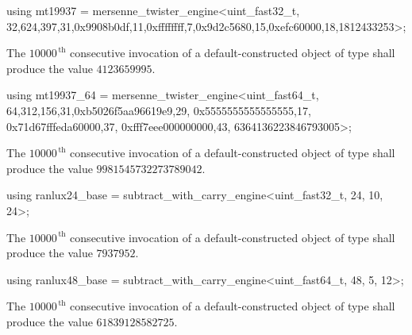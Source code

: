 %
%
\begin{itemdecl}
using mt19937 =
      mersenne_twister_engine<uint_fast32_t,
       32,624,397,31,0x9908b0df,11,0xffffffff,7,0x9d2c5680,15,0xefc60000,18,1812433253>;
\end{itemdecl}

\begin{itemdescr}
\pnum\required
 The $10000^{\,\mathrm{th}}$ consecutive invocation
 of a default-constructed object
 of type 
 shall produce the value $4123659995$.
\end{itemdescr}

%
%
\begin{itemdecl}
using mt19937_64 =
      mersenne_twister_engine<uint_fast64_t,
       64,312,156,31,0xb5026f5aa96619e9,29,
       0x5555555555555555,17,
       0x71d67fffeda60000,37,
       0xfff7eee000000000,43,
       6364136223846793005>;
\end{itemdecl}

\begin{itemdescr}
\pnum\required
 The $10000^{\,\mathrm{th}}$ consecutive invocation
 of a default-constructed object
 of type 
 shall produce the value $9981545732273789042$.
\end{itemdescr}

%
%
\begin{itemdecl}
using ranlux24_base =
      subtract_with_carry_engine<uint_fast32_t, 24, 10, 24>;
\end{itemdecl}

\begin{itemdescr}
\pnum\required
 The $10000^{\,\mathrm{th}}$ consecutive invocation
 of a default-constructed object
 of type 
 shall produce the value
 $7937952$.
\end{itemdescr}

%
%
\begin{itemdecl}
using ranlux48_base =
      subtract_with_carry_engine<uint_fast64_t, 48, 5, 12>;
\end{itemdecl}

\begin{itemdescr}
\pnum\required
 The $10000^{\,\mathrm{th}}$ consecutive invocation
 of a default-constructed object
 of type 
 shall produce the value
 $61839128582725$.
\end{itemdescr}

